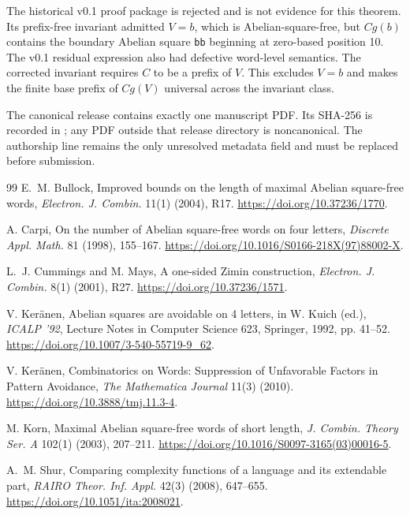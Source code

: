 \documentclass[11pt]{article}
\theoremstyle{definition}
\newcommand{\code}[1]{\texttt{#1}}
\begin{document}
The historical v0.1 proof package is rejected and is not evidence for this theorem. Its prefix-free invariant admitted $V=b$, which is Abelian-square-free, but $Cg(b)$ contains the boundary Abelian square \code{bb} beginning at zero-based position 10. The v0.1 residual expression also had defective word-level semantics. The corrected invariant requires $C$ to be a prefix of $V$. This excludes $V=b$ and makes the finite base prefix of $Cg(V)$ universal across the invariant class.

The canonical release contains exactly one manuscript PDF. Its SHA-256 is recorded in ; any PDF outside that release directory is noncanonical. The authorship line remains the only unresolved metadata field and must be replaced before submission.

\begin{thebibliography}{99}
E.~M. Bullock,
\newblock Improved bounds on the length of maximal Abelian square-free words,
\newblock \emph{Electron. J. Combin.} 11(1) (2004), R17.
\newblock \url{https://doi.org/10.37236/1770}.

A. Carpi,
\newblock On the number of Abelian square-free words on four letters,
\newblock \emph{Discrete Appl. Math.} 81 (1998), 155--167.
\newblock \url{https://doi.org/10.1016/S0166-218X(97)88002-X}.

L.~J. Cummings and M. Mays,
\newblock A one-sided Zimin construction,
\newblock \emph{Electron. J. Combin.} 8(1) (2001), R27.
\newblock \url{https://doi.org/10.37236/1571}.

V. Ker\"anen,
\newblock Abelian squares are avoidable on 4 letters,
\newblock in W. Kuich (ed.), \emph{ICALP '92}, Lecture Notes in Computer Science 623, Springer, 1992, pp. 41--52.
\newblock \url{https://doi.org/10.1007/3-540-55719-9_62}.

V. Ker\"anen,
\newblock Combinatorics on Words: Suppression of Unfavorable Factors in Pattern Avoidance,
\newblock \emph{The Mathematica Journal} 11(3) (2010).
\newblock \url{https://doi.org/10.3888/tmj.11.3-4}.

M. Korn,
\newblock Maximal Abelian square-free words of short length,
\newblock \emph{J. Combin. Theory Ser. A} 102(1) (2003), 207--211.
\newblock \url{https://doi.org/10.1016/S0097-3165(03)00016-5}.

A.~M. Shur,
\newblock Comparing complexity functions of a language and its extendable part,
\newblock \emph{RAIRO Theor. Inf. Appl.} 42(3) (2008), 647--655.
\newblock \url{https://doi.org/10.1051/ita:2008021}.
\end{thebibliography}
\end{document}
